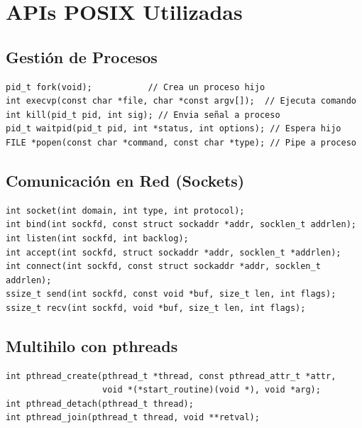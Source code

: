 \documentclass[12pt,a4paper]{report}
\begin{document}
\section{APIs POSIX Utilizadas}

\subsection{Gestión de Procesos}

\begin{tcolorbox}[colback=grisClaro, colframe=azulTitulo, title=\textbf{Llamadas al Sistema — Procesos}]
\begin{lstlisting}[style=cstyle, numbers=none]
pid_t fork(void);           // Crea un proceso hijo
int execvp(const char *file, char *const argv[]);  // Ejecuta comando
int kill(pid_t pid, int sig); // Envia señal a proceso
pid_t waitpid(pid_t pid, int *status, int options); // Espera hijo
FILE *popen(const char *command, const char *type); // Pipe a proceso
\end{lstlisting}
\end{tcolorbox}

\subsection{Comunicación en Red (Sockets)}

\begin{tcolorbox}[colback=grisClaro, colframe=azulTitulo, title=\textbf{Llamadas al Sistema — Sockets TCP}]
\begin{lstlisting}[style=cstyle, numbers=none]
int socket(int domain, int type, int protocol);
int bind(int sockfd, const struct sockaddr *addr, socklen_t addrlen);
int listen(int sockfd, int backlog);
int accept(int sockfd, struct sockaddr *addr, socklen_t *addrlen);
int connect(int sockfd, const struct sockaddr *addr, socklen_t addrlen);
ssize_t send(int sockfd, const void *buf, size_t len, int flags);
ssize_t recv(int sockfd, void *buf, size_t len, int flags);
\end{lstlisting}
\end{tcolorbox}

\subsection{Multihilo con pthreads}

\begin{tcolorbox}[colback=grisClaro, colframe=azulTitulo, title=\textbf{API de Hilos POSIX}]
\begin{lstlisting}[style=cstyle, numbers=none]
int pthread_create(pthread_t *thread, const pthread_attr_t *attr,
                   void *(*start_routine)(void *), void *arg);
int pthread_detach(pthread_t thread);
int pthread_join(pthread_t thread, void **retval);
\end{lstlisting}
\end{tcolorbox}
\end{document}

